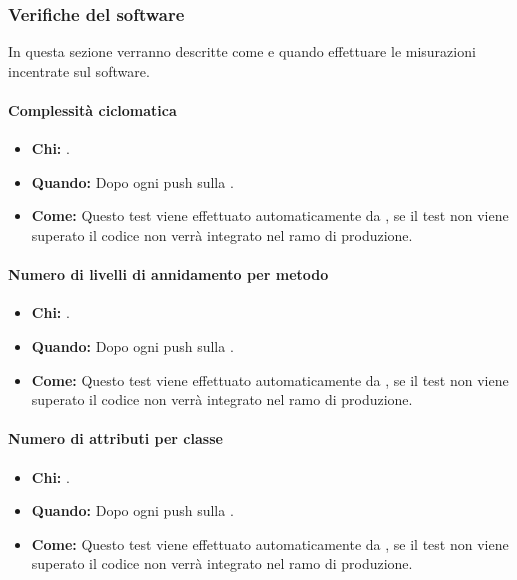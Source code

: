 \newpage
\subsubsection{Verifiche del software}
In questa sezione verranno descritte come e quando effettuare le misurazioni incentrate sul software.

\paragraph{Complessità ciclomatica}
\begin{itemize}
\item \textbf{Chi:} .
\item \textbf{Quando:} Dopo ogni push sulla .
\item \textbf{Come:} Questo test viene effettuato automaticamente da , se il test non viene superato il codice non verrà integrato nel ramo di produzione.
\end{itemize}

\paragraph{Numero di livelli di annidamento per metodo}
\begin{itemize}
\item \textbf{Chi:} .
\item \textbf{Quando:} Dopo ogni push sulla .
\item \textbf{Come:} Questo test viene effettuato automaticamente da , se il test non viene superato il codice non verrà integrato nel ramo di produzione.
\end{itemize}

\paragraph{Numero di attributi per classe}
\begin{itemize}
\item \textbf{Chi:} .
\item \textbf{Quando:} Dopo ogni push sulla .
\item \textbf{Come:} Questo test viene effettuato automaticamente da , se il test non viene superato il codice non verrà integrato nel ramo di produzione.
\end{itemize}

